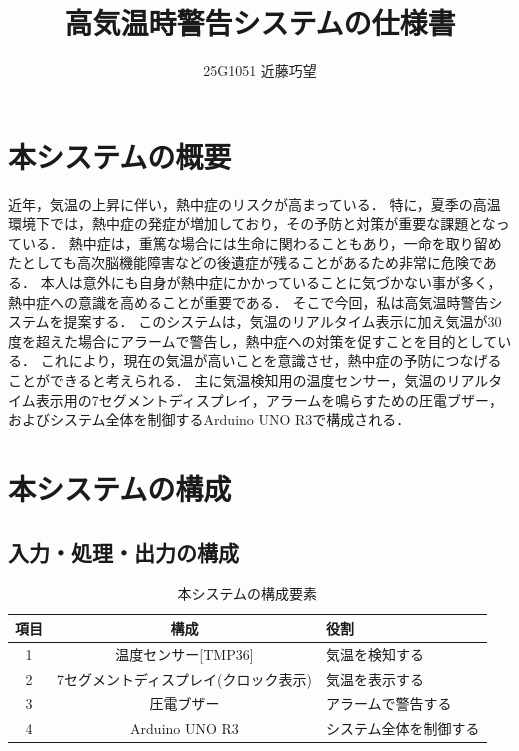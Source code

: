 \documentclass[uplatex,dvipdfmx]{jsarticle}
\begin{document}
\title{高気温時警告システムの仕様書}
\author{25G1051 近藤巧望}
\maketitle
\section{本システムの概要}
\indent
近年，気温の上昇に伴い，熱中症のリスクが高まっている．
特に，夏季の高温環境下では，熱中症の発症が増加しており，その予防と対策が重要な課題となっている．
熱中症は，重篤な場合には生命に関わることもあり，一命を取り留めたとしても高次脳機能障害などの後遺症が残ることがあるため非常に危険である．
本人は意外にも自身が熱中症にかかっていることに気づかない事が多く，熱中症への意識を高めることが重要である．
そこで今回，私は高気温時警告システムを提案する．
このシステムは，気温のリアルタイム表示に加え気温が30度を超えた場合にアラームで警告し，熱中症への対策を促すことを目的としている．
これにより，現在の気温が高いことを意識させ，熱中症の予防につなげることができると考えられる．
主に気温検知用の温度センサー，気温のリアルタイム表示用の7セグメントディスプレイ，アラームを鳴らすための圧電ブザー，およびシステム全体を制御するArduino UNO R3で構成される．

\section{本システムの構成}
\subsection{入力・処理・出力の構成}

\begin{table}[H]
  \centering
  \caption{本システムの構成要素}
  \label{table:presentation}
  \begin{tabular}{ccl}
\hline
項目 & 構成 & 役割 \\\hline \hline
1 & 温度センサー[TMP36] & 気温を検知する \\ \hline
2 & 7セグメントディスプレイ(クロック表示) & 気温を表示する \\ \hline
3 & 圧電ブザー & アラームで警告する \\ \hline
4 & Arduino UNO R3 & システム全体を制御する \\ \hline
  \end{tabular}  
\end{table}
\end{document}
